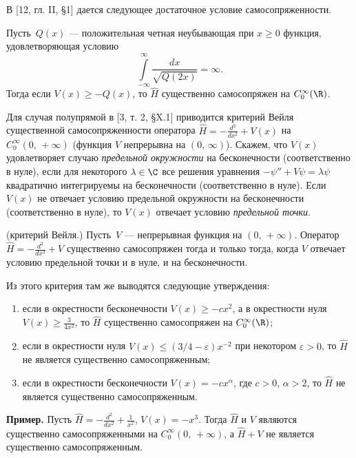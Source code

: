 \documentclass[a4paper
]{article}
\begin{document}
В [12, гл. II, \S 1] дается следующее достаточное условие самосопряженности.
\begin{Trm}
\label{62trm1}
Пусть $\, Q(x)$ --- положительная четная неубывающая при $x\ge 0$ функция,
удовлетворяющая условию $$\int \limits_{-\infty}^\infty \frac{dx}{\sqrt
{Q(2x)}}=\infty.$$ Тогда если $V(x)\ge -Q(x)$, то $\hat H$ существенно
самосопряжен на $C_0^\infty(\R)$.
\end{Trm}
Для случая полупрямой в [3, т. 2, \S X.1] приводится критерий Вейля
существенной самосопряженности оператора $\hat H=-\frac{d^2}{dx^2}+V(x)$ на
$C_0^\infty(0, \, +\infty)$ (функция $V$ непрерывна на $(0, \, \infty)$).
Скажем, что $V(x)$ удовлетворяет случаю {\it предельной окружности} на
бесконечности (соответственно в нуле), если для некоторого $\lambda\in \C$
все решения уравнения $-\psi''+V\psi=\lambda\psi$ квадратично интегрируемы на
бесконечности (соответственно в нуле). Если $V(x)$ не отвечает условию
предельной окружности на бесконечности (соответственно в нуле), то
$V(x)$ отвечает условию {\it предельной точки}.
\begin{Trm}
(критерий Вейля.) Пусть $\, V$ --- непрерывная функция на $(0, \, +\infty)$.
Оператор $\hat H=-\frac{d^2}{dx^2}+V$ существенно самосопряжен тогда и
только тогда, когда $V$ отвечает условию предельной точки и в нуле, и
на бесконечности.
\end{Trm}
Из этого критерия там же выводятся следующие утверждения:
\begin{enumerate}
\item если в окрестности бесконечности $V(x)\ge -cx^2$, а в окрестности
нуля $V(x)\ge \frac{3}{4x^2}$, то $\hat H$ существенно самосопряжен на
$C_0^\infty(\R)$;
\item если в окрестности нуля $V(x)\le (3/4-\varepsilon)x^{-2}$ при
некотором $\varepsilon>0$, то $\hat H$ не является существенно
самосопряженным;
\item если в окрестности бесконечности  $V(x)=-cx^\alpha$, где $c>0$,
$\alpha>2$, то $\hat H$ не является существенно самосопряженным.
\end{enumerate}
{\bf Пример.} Пусть $\hat H=-\frac{d^2}{dx^2}+\frac{1}{x^2}$, $V(x)=-x^3$. Тогда $\hat H$ и
$V$ являются существенно самосопряженными
на $C_0^\infty(0, \, +\infty)$, а $\hat H+V$ не является существенно
самосопряженным.
\end{document}
